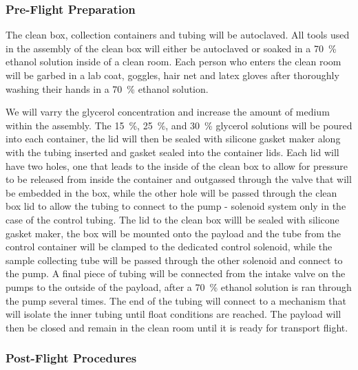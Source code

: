 \subsubsection{Pre-Flight Preparation}

The clean box, collection containers and tubing will be autoclaved. All tools used in the assembly of the clean box will either be autoclaved or soaked in a \SI{70}{\percent} ethanol solution inside of a clean room. Each person who enters the clean room will be garbed in a lab coat, goggles, hair net and latex gloves after thoroughly washing their hands in a \SI{70}{\percent} ethanol solution. 

We will varry the glycerol concentration and increase the amount of medium within the assembly.  The \SI{15}{\percent}, \SI{25}{\percent}, and \SI{30}{\percent} glycerol solutions will be poured into each container, the lid will then be sealed with silicone gasket maker along with the tubing inserted and gasket sealed into the container lids. Each lid will have two holes, one that leads to the inside of the clean box to allow for pressure to be released from inside the container and outgassed through the valve that will be embedded in the box, while the other hole will be passed through the clean box lid to allow the tubing to connect to the pump - solenoid system only in the case of the control tubing. The lid to the clean box willl be sealed with silicone gasket maker, the box will be mounted onto the payload and the tube from the control container will be clamped to the dedicated control solenoid, while the sample collecting tube will be passed through the other solenoid and connect to the pump. A final piece of tubing will be connected from the intake valve on the pumps to the outside of the payload, after a \SI{70}{\percent} ethanol solution is ran through the pump several times. The end of the tubing will connect to a mechanism that will isolate the inner tubing until float conditions are reached. The payload will then be closed and remain  in the clean room until it is ready for transport flight.

\subsubsection{Post-Flight Procedures}

